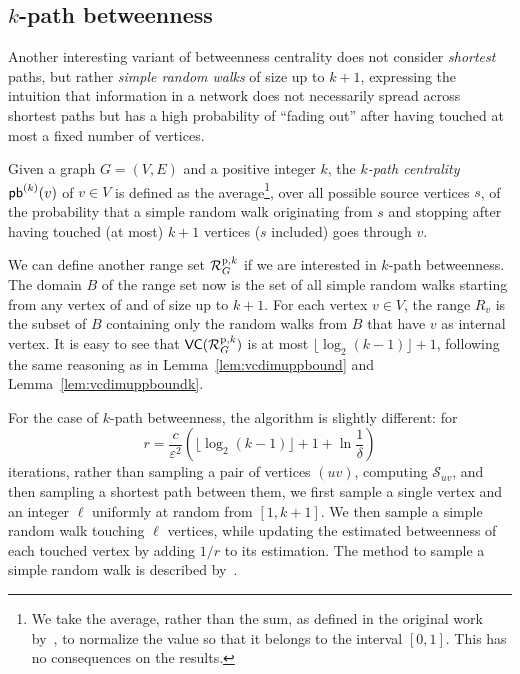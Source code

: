 \subsection{$k$-path betweenness}
Another interesting variant of betweenness centrality does not consider
\emph{shortest} paths, but rather \emph{simple random walks} of size up to
$k+1$, expressing the intuition that information in a network does not
necessarily spread across shortest paths but has a high probability of ``fading
out'' after having touched at most a fixed number of vertices.

\begin{definition}\label{def:kpathbetweenness}
 Given a graph $G=(V,E)$ and a positive integer $k$, the \emph{$k$-path
 centrality} $\mathsf{pb}^{(k)}(v)$ of $v\in V$ is defined as the average\footnote{We take the
 average, rather than the sum, as defined in the original work
 by~\citet{KourtellisASIT12}, to normalize the value so that it belongs to the interval
 $[0,1]$. This has no consequences on the results.}, over all possible source
 vertices $s$, of the probability that a simple random walk originating from
 $s$ and stopping after having touched (at most) $k+1$ vertices ($s$
 included) goes through $v$.
\end{definition}

We can define another range set $\mathcal{R}_G^{\mathrm{p},k}$ if we are interested
in $k$-path betweenness. The domain $B$ of the range set now is the set of all
simple random walks starting from any vertex of and of size up to $k+1$. For
each vertex $v\in V$, the range $R_v$ is the subset of $B$ containing only the
random walks from $B$ that have $v$ as internal vertex. It is easy to
see that $\mathsf{VC}(\mathcal{R}_G^{\mathrm{p},k})$ is at most
$\lfloor\log_2(k-1)\rfloor+1$, 
following the same reasoning as in Lemma~\ref{lem:vcdimuppbound} and
Lemma~\ref{lem:vcdimuppboundk}.

For the case of $k$-path betweenness, the algorithm is slightly different:
for 
\[
  r= \frac{c}{\varepsilon^2}\left(\lfloor\log_2(k-1)\rfloor + 1 +\ln\frac{1}{\delta}\right)
\]
iterations, rather than sampling a pair of vertices $(uv)$, computing
$\mathcal{S}_{uv}$, and then sampling a shortest path between them, we first sample a
single vertex and an integer $\ell$ uniformly at random from $[1,k+1]$. We then
sample a simple random walk touching $\ell$ vertices, while updating the estimated
betweenness of each touched vertex by adding $1/r$ to its estimation. The method
to sample a simple random walk is described by~\citet{KourtellisASIT12}.

